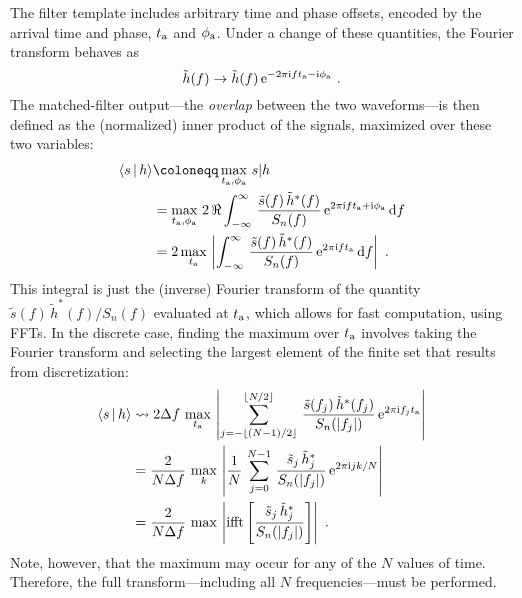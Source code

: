 \documentclass[aps, prd, amsfonts, amssymb, amsmath, %
nofootinbib]{revtex4}
\begin{document}
The filter template includes arbitrary time and phase offsets, encoded
by the arrival time and phase, $t_{\text{a}}$ and $\phi_{\text{a}}$.  Under a change of
these quantities, the Fourier transform behaves as
\begin{equation}
  \label{eq:EffectOfTimeAndPhaseOffset}
  \tilde{h}(f) \to \tilde{h}(f)\, \e^{-2\pi\i f \ta - \i \phia}\ .
\end{equation}
The matched-filter output---the \emph{overlap} between the two
waveforms---is then defined as the (normalized) inner product of the
signals, maximized over these two variables:
\begin{subequations}
  \begin{align}
    \label{eq:OverlapDefinition}
    \Overlap{s|h} &\coloneqq \max_{\ta, \phia}\, \InnerProduct{s|h} \\
    &= \max_{\ta, \phia}\, 2\, \Re \int_{-\infty}^{\infty}\,
    \frac{\tilde{s}(f)\, \tilde{h}^{\ast}(f)}{S_{n}(f)}\, \e^{2\pi \i
      f\ta + \i \phia}\, \d f
    \\
    & = 2 \max_{\ta}\, \abs{\int_{-\infty}^{\infty}\,
      \frac{\tilde{s}(f)\, \tilde{h}^{\ast}(f)}{S_{n}(f)}\, \e^{2\pi
        \i f\ta}\, \d f }\ .
  \end{align}
\end{subequations}
This integral is just the (inverse) Fourier transform of the quantity
$\tilde{s}(f)\, \tilde{h}^{\ast}(f) / S_{n}(f)$ evaluated at $t_{\text{a}}$,
which allows for fast computation, using FFTs.  In the discrete case,
finding the maximum over $t_{\text{a}}$ involves taking the Fourier transform
and selecting the largest element of the finite set that results from
discretization:
\begin{subequations}
  \label{eq:OverlapDiscretized}
  \begin{align}
    \label{eq:OverlapDiscretizedA}
    \Braket{s|h} &\rightsquigarrow 2 \Delta f\, \max_{t_{\text{a}}}\,
    \left\lvert{\sum_{j=-\left\lfloor{(N-1)/2}\right\rfloor}^{\left\lfloor{N/2}\right\rfloor}\,
      \frac{\tilde{s}(f_{j})\,
        \tilde{h}^{\ast}(f_{j})}{S_{n}(\left\lvert{f_{j}}\right\rvert)}\, \ensuremath{\mathrm{e}}^{2\pi \ensuremath{\mathrm{i}}f_{j} \ensuremath{t_{\text{a}}}}}\right\rvert
    \\
    \label{eq:OverlapDiscretizedB}
    &= \frac{2}{N \Delta f}\, \max_{k}\, \left\lvert{\frac{1}{N}\,
      \sum_{j=0}^{N-1}\, \frac{\tilde{s}_{j}\,
        \tilde{h}^{\ast}_{j}}{S_{n}(\left\lvert{f_{j}}\right\rvert)}\, \ensuremath{\mathrm{e}}^{2\pi \ensuremath{\mathrm{i}}j k /
        N}}\right\rvert
    \\
    \label{eq:OverlapDiscretizedC}
    &= \frac{2}{N \Delta f}\, \max\, \left\lvert{\operatorname{ifft}\left[
        \frac{\tilde{s}_{j}\,
          \tilde{h}^{\ast}_{j}}{S_{n}(\left\lvert{f_{j}}\right\rvert)} \right]}\right\rvert\ .
  \end{align}
\end{subequations}
Note, however, that the maximum may occur for any of the $N$ values of
time.  Therefore, the full transform---including all $N$
frequencies---must be performed.
\end{document}

